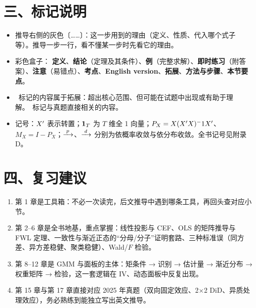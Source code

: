 \section*{三、标记说明}
\begin{itemize}
\item 推导右侧的灰色〔……〕：这一步用到的理由（定义、性质、代入哪个式子等）。推导一步一行，看不懂某一步时先看它的理由。
\item 彩色盒子：
  \textcolor{cdef}{\bfseries 定义}、\textcolor{cthm}{\bfseries 结论}（定理及其条件）、\textcolor{cex}{\bfseries 例}（完整求解）、\textcolor{cpr}{\bfseries 即时练习}（附答案）、\textcolor{cnote}{\bfseries 注意}（易错点）、\textcolor{ckey}{\bfseries 考点}、\textcolor{ceng}{\bfseries English version}、\textcolor{cext}{\bfseries 拓展}、\textcolor{cmeth}{\bfseries 方法与步骤}、\textcolor{chead}{\bfseries 本节要点}。
\item \tagext\ 标记的内容属于拓展：超出核心范围、但可能在试题中出现或有助于理解。\tagexam\ 标记与真题直接相关的内容。
\item 记号：$X'$ 表示转置；$\mathbf{1}_T$ 为 $T$ 维全 1 向量；$P_X=X(X' X)^-1 X'$、$M_X=I-P_X$；$\xrightarrow{\;p\;}$、$\xrightarrow{\;d\;}$ 分别为依概率收敛与依分布收敛。全书记号见附录 D。
\end{itemize}

\section*{四、复习建议}
\begin{enumerate}
\item 第 1 章是工具箱：不必一次读完，后文推导中遇到哪条工具，再回头查对应小节。
\item 第 2–6 章是全书地基，重点掌握：线性投影与 CEF、OLS 的矩阵推导与 FWL 定理、一致性与渐近正态的“分母/分子”证明套路、三种标准误（同方差、异方差稳健、聚类稳健）、Wald/$F$ 检验。
\item 第 8–12 章是 GMM 与面板的主体：矩条件 → 识别 → 估计量 → 渐近分布 → 权重矩阵 → 检验，这一套逻辑在 IV、动态面板中反复出现。
\item 第 15 章与第 17 章直接对应 2025 年真题（双向固定效应、2$\times$2 DiD、异质处理效应），务必熟练到能独立写出英文推导。
\end{enumerate}
